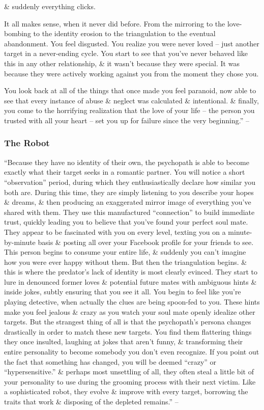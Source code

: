\documentclass{article}
\numberwithin{equation}{section}
\begin{document}
\& suddenly everything clicks.

It all makes sense, when it never did before. From the mirroring to the love-bombing to the identity erosion to the triangulation to the eventual abandonment. You feel disgusted. You realize you were never loved -- just another target in a never-ending cycle. You start to see that you've never behaved like this in any other relationship, \& it wasn't because they were special. It was because they were actively working against you from the moment they chose you.

You look back at all of the things that once made you feel paranoid, now able to see that every instance of abuse \& neglect was calculated \& intentional. \& finally, you come to the horrifying realization that the love of your life -- the person you trusted with all your heart -- set you up for failure since the very beginning.'' -- \cite[pp. 112--113]{MacKenzie2015}

\subsubsection{The Robot}
``Because they have no identity of their own, the psychopath is able to become exactly what their target seeks in a romantic partner. You will notice a short ``observation'' period, during which they enthusiastically declare how similar you both are. During this time, they are simply listening to you describe your hopes \& dreams, \& then producing an exaggerated mirror image of everything you've shared with them. They use this manufactured ``connection'' to build immediate trust, quickly leading you to believe that you've found your perfect soul mate. They appear to be fascinated with you on every level, texting you on a minute-by-minute basis \& posting all over your Facebook profile for your friends to see. This person begins to consume your entire life, \& suddenly you can't imagine how you were ever happy without them. But then the triangulation begins. \& this is where the predator's lack of identity is most clearly evinced. They start to lure in denounced former loves \& potential future mates with ambiguous hints \& inside jokes, subtly ensuring that you see it all. You begin to feel like you're playing detective, when actually the clues are being spoon-fed to you. These hints make you feel jealous \& crazy as you watch your soul mate openly idealize other targets. But the strangest thing of all is that the psychopath's persona changes drastically in order to match these new targets. You find them flattering things they once insulted, laughing at jokes that aren't funny, \& transforming their entire personality to become somebody you don't even recognize. If you point out the fact that something has changed, you will be deemed ``crazy'' or ``hypersensitive.'' \& perhaps most unsettling of all, they often steal a little bit of your personality to use during the grooming process with their next victim. Like a sophisticated robot, they evolve \& improve with every target, borrowing the traits that work \& disposing of the depleted remains.'' -- \cite[pp. 113--114]{MacKenzie2015}
\end{document}
